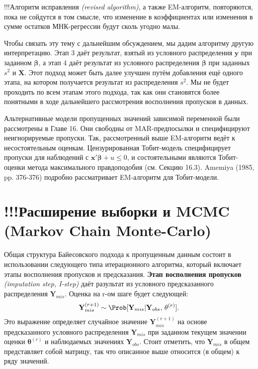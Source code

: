 !!!Алгоритм исправления \emph{(revised algorithm)}, а также EM-алгоритм, повторяются, пока не сойдутся в том смысле, что изменение в коэффициентах или изменения в сумме остатков МНК-регрессии будут сколь угодно малы.

Чтобы связать эту тему с дальнейшим обсуждением, мы дадим алгоритму другую интерпретацию. Этап 3 даёт результат, взятый из условного распределения $\mathbf{y}$ при заданном $\mathbf{\beta}$, а этап 4 даёт результат из условного распределения $\mathbf{\beta}$ при заданных $s^2$ и $\mathbf{X}$. Этот подход может быть далее улучшен путём добавления ещё одного этапа, на котором получается результат из распределения $s^2$. Мы не будет проходить по всем этапам этого подхода, так как они становятся более понятными в ходе дальнейшего рассмотрения восполнения пропусков в данных.

Альтернативные модели пропущенных значений зависимой переменной были рассмотрены в Главе 16. Они свободны от MAR-предпосылки и специфицируют неигнорируемые пропуски. Так, рассмотренный выше EM-алгоритм ведёт к несостоятельным оценкам. Цензурированная Тобит-модель специфицирует пропуски для наблюдений с $\mathbf{x'\beta}+u \leqslant 0$, и состоятельными являются Тобит-оценки метода максимального правдоподобия (см. Секцию 16.3). Amemiya (1985, pp. 376-376) подробно рассматривает EM-алгоритм для Тобит-модели.

\section{!!!Расширение выборки и MCMC (Markov Chain Monte-Carlo)}
Общая структура Байесовского подхода к пропущенным данным состоит в использовании следующего типа итерационного алгоритма, который включает этапы восполнения пропусков и предсказания. 
{\bf Этап восполнения пропусков} \emph{(imputation step, I-step)} даёт разультат из условного предсказанного распределения $\mathbf{Y}_{mis}$. Оценка на r-ом шаге будет следующей:
\begin{equation}
\mathbf{Y}_{mis}^{(r+1)} \sim \Prob[\mathbf{Y}_{mis}|\mathbf{Y}_{obs}, \, \mathbf{\theta}^{(r)}].
\end{equation}
Это выражение определяет случайное значение $\mathbf{Y}_{mis}^{(r+1)}$ на основе предсказанного условного распределения $\mathbf{Y}_{mis}$ при заданном текущем значении оценки $\mathbf{\theta}^{(r)}$ и наблюдаемых значениях $\mathbf{Y}_{obs}$. Стоит отметить, что $\mathbf{Y}_{mis}$ в общем представляет собой матрицу, так что описанное выше относится  (в общем) к ряду значений.

